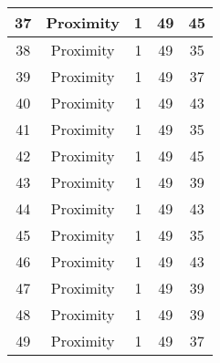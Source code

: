 \documentclass[results.tex]{subfiles}
\begin{document}
\begin{center}
\begin{tabular}{| c || c | c | c | c |}
            \hline
            37                      & Proximity                    & 1                      & 49                      & 45                   \\
            \hline
            38                      & Proximity                    & 1                      & 49                      & 35                   \\
            \hline
            39                      & Proximity                    & 1                      & 49                      & 37                   \\
            \hline
            40                      & Proximity                    & 1                      & 49                      & 43                   \\
            \hline
            41                      & Proximity                    & 1                      & 49                      & 35                   \\
            \hline
            42                      & Proximity                    & 1                      & 49                      & 45                   \\
            \hline
            43                      & Proximity                    & 1                      & 49                      & 39                   \\
            \hline
            44                      & Proximity                    & 1                      & 49                      & 43                   \\
            \hline
            45                      & Proximity                    & 1                      & 49                      & 35                   \\
            \hline
            46                      & Proximity                    & 1                      & 49                      & 43                   \\
            \hline
            47                      & Proximity                    & 1                      & 49                      & 39                   \\
            \hline
            48                      & Proximity                    & 1                      & 49                      & 39                   \\
            \hline
            49                      & Proximity                    & 1                      & 49                      & 37                   \\
            \hline
        \end{tabular}
    \end{center}
\end{document}
